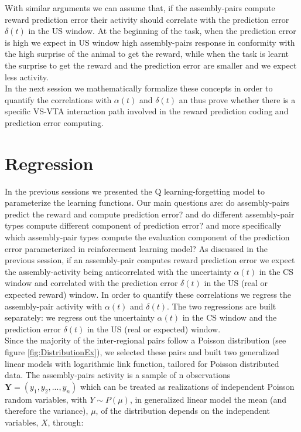 With similar arguments we can assume that, if the assembly-pairs compute reward prediction error their activity should correlate with the prediction error $\delta(t)$ in the US window. At the beginning of the task, when the prediction error is high we expect in US window high assembly-pairs response in conformity with the high surprise of the animal to get the reward, while when the task is learnt the surprise to get the reward and the prediction error are smaller and we expect less activity.\\
In the next session we mathematically formalize these concepts in order to quantify the correlations with $\alpha(t)$ and $\delta(t)$ an thus prove whether there is a specific VS-VTA interaction path involved in the reward prediction coding and prediction error computing. 


\section{Regression}
\label{sec:Regression}
In the previous sessions we presented the Q learning-forgetting model to parameterize the learning functions. Our main questions are: do assembly-pairs predict the reward and compute prediction error? and do different assembly-pair types compute different component of prediction error? and more specifically which assembly-pair types compute the evaluation component of the prediction error parameterized in reinforcement learning model? As discussed in the previous session, if an assembly-pair computes reward prediction error we expect the assembly-activity being anticorrelated with the uncertainty $\alpha(t)$ in the CS window and correlated with the prediction error $\delta(t)$ in the US (real or expected reward) window. In order to quantify these correlations we regress the assembly-pair activity with $\alpha (t)$ and $\delta (t)$. The two regressions are built separately: we regress out the uncertainty $\alpha(t)$ in the CS window and the prediction error $\delta(t)$ in the US (real or expected) window.\\
Since the majority of the inter-regional pairs follow a Poisson distribution (see figure \ref{fig:DistributionEx}), we selected these pairs and built two generalized linear models with logarithmic link function, tailored for Poisson distributed data.
The assembly-pairs activity is a sample of n observations $\mathbf{Y}=(y_1, y_2,..., y_n)$ which can be treated as realizations of independent Poisson random variables, with $Y\sim P(\mu)$, in generalized linear model the mean (and therefore the variance), $\mu$, of the distribution depends on the independent variables, $X$, through:
